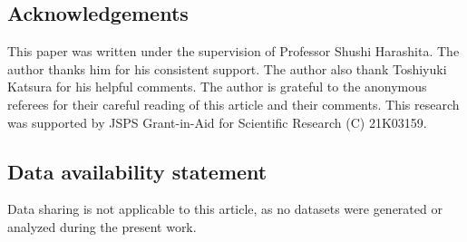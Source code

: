 \documentclass[a4paper, 11pt]{article}
\theoremstyle{plain}
\newcommand{\?}{\textcolor{red}{??}}
\begin{document}
 
\subsection*{Acknowledgements}
This paper was written under the supervision of Professor Shushi Harashita.
The author thanks him for his consistent support. 
The author also thank Toshiyuki Katsura for his helpful comments.
The author is grateful to the anonymous referees for their careful reading of this article and their comments. 
This research was supported by JSPS Grant-in-Aid for Scientific Research (C) 21K03159.
 
\subsection*{Data availability statement} 
Data sharing is not applicable to this article, as no datasets were generated or analyzed during the present work.
\end{document}
